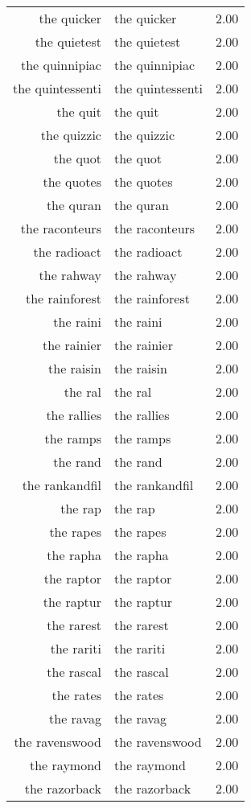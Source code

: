 \begin{table}[ht]
\begin{tabular}{rlr}
  the quicker & the quicker & 2.00 \\ 
  the quietest & the quietest & 2.00 \\ 
  the quinnipiac & the quinnipiac & 2.00 \\ 
  the quintessenti & the quintessenti & 2.00 \\ 
  the quit & the quit & 2.00 \\ 
  the quizzic & the quizzic & 2.00 \\ 
  the quot & the quot & 2.00 \\ 
  the quotes & the quotes & 2.00 \\ 
  the quran & the quran & 2.00 \\ 
  the raconteurs & the raconteurs & 2.00 \\ 
  the radioact & the radioact & 2.00 \\ 
  the rahway & the rahway & 2.00 \\ 
  the rainforest & the rainforest & 2.00 \\ 
  the raini & the raini & 2.00 \\ 
  the rainier & the rainier & 2.00 \\ 
  the raisin & the raisin & 2.00 \\ 
  the ral & the ral & 2.00 \\ 
  the rallies & the rallies & 2.00 \\ 
  the ramps & the ramps & 2.00 \\ 
  the rand & the rand & 2.00 \\ 
  the rankandfil & the rankandfil & 2.00 \\ 
  the rap & the rap & 2.00 \\ 
  the rapes & the rapes & 2.00 \\ 
  the rapha & the rapha & 2.00 \\ 
  the raptor & the raptor & 2.00 \\ 
  the raptur & the raptur & 2.00 \\ 
  the rarest & the rarest & 2.00 \\ 
  the rariti & the rariti & 2.00 \\ 
  the rascal & the rascal & 2.00 \\ 
  the rates & the rates & 2.00 \\ 
  the ravag & the ravag & 2.00 \\ 
  the ravenswood & the ravenswood & 2.00 \\ 
  the raymond & the raymond & 2.00 \\ 
  the razorback & the razorback & 2.00 \\ 

\end{tabular}
\end{table}
